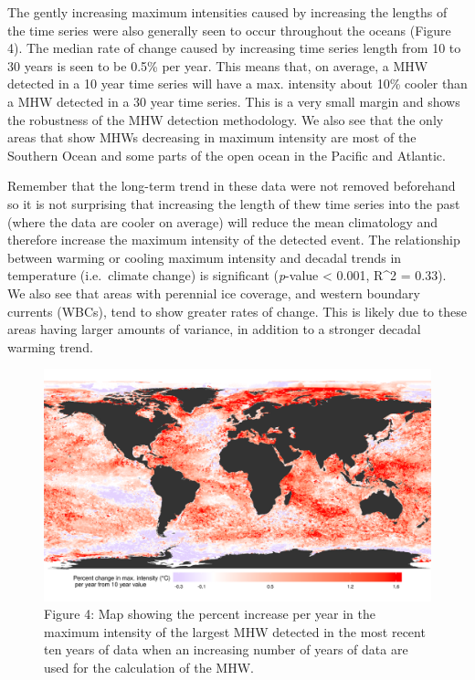 \documentclass[]{article}
\begin{document}
The gently increasing maximum intensities caused by increasing the
lengths of the time series were also generally seen to occur throughout
the oceans (Figure 4). The median rate of change caused by increasing
time series length from 10 to 30 years is seen to be 0.5\% per year.
This means that, on average, a MHW detected in a 10 year time series
will have a max. intensity about 10\% cooler than a MHW detected in a 30
year time series. This is a very small margin and shows the robustness
of the MHW detection methodology. We also see that the only areas that
show MHWs decreasing in maximum intensity are most of the Southern Ocean
and some parts of the open ocean in the Pacific and Atlantic.

Remember that the long-term trend in these data were not removed
beforehand so it is not surprising that increasing the length of thew
time series into the past (where the data are cooler on average) will
reduce the mean climatology and therefore increase the maximum intensity
of the detected event. The relationship between warming or cooling
maximum intensity and decadal trends in temperature (i.e.~climate
change) is significant (\emph{p}-value \textless{} 0.001, R\^{}2 =
0.33). We also see that areas with perennial ice coverage, and western
boundary currents (WBCs), tend to show greater rates of change. This is
likely due to these areas having larger amounts of variance, in addition
to a stronger decadal warming trend.

\begin{figure}
\centering
\includegraphics{../LaTeX/fig_4.png}
\caption{Figure 4: Map showing the percent increase per year in the
maximum intensity of the largest MHW detected in the most recent ten
years of data when an increasing number of years of data are used for
the calculation of the MHW.}
\end{figure}
\end{document}
